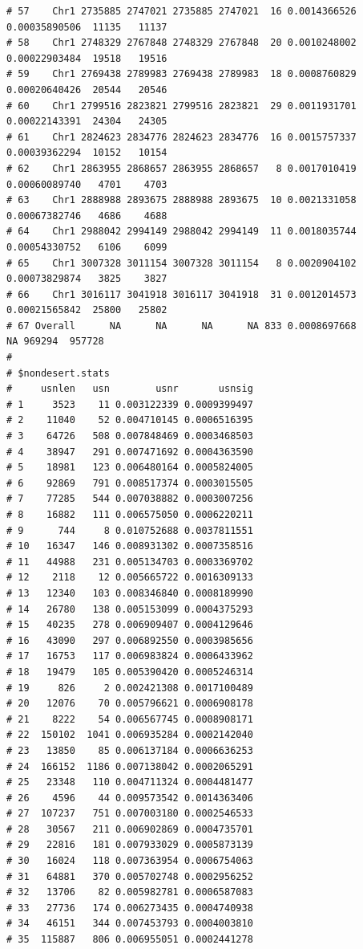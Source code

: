 \documentclass{article}\usepackage[]{graphicx}\usepackage[]{color}
\makeatletter
\newenvironment{kframe}{%
 \def\at@end@of@kframe{}%
 \ifinner\ifhmode%
  \def\at@end@of@kframe{\end{minipage}}%
  \begin{minipage}{\columnwidth}%
 \fi\fi%
 \def\FrameCommand##1{\hskip\@totalleftmargin \hskip-\fboxsep
 \colorbox{shadecolor}{##1}\hskip-\fboxsep
     \hskip-\linewidth \hskip-\@totalleftmargin \hskip\columnwidth}%
 \MakeFramed {\advance\hsize-\width
   \@totalleftmargin\z@ \linewidth\hsize
   \@setminipage}}%
 {\par\unskip\endMakeFramed%
 \at@end@of@kframe}
\newenvironment{knitrout}{}{} %
\makeatother
\begin{document}
\begin{knitrout}
\begin{kframe}
\begin{verbatim}
# 57    Chr1 2735885 2747021 2735885 2747021  16 0.0014366526 0.00035890506  11135   11137
# 58    Chr1 2748329 2767848 2748329 2767848  20 0.0010248002 0.00022903484  19518   19516
# 59    Chr1 2769438 2789983 2769438 2789983  18 0.0008760829 0.00020640426  20544   20546
# 60    Chr1 2799516 2823821 2799516 2823821  29 0.0011931701 0.00022143391  24304   24305
# 61    Chr1 2824623 2834776 2824623 2834776  16 0.0015757337 0.00039362294  10152   10154
# 62    Chr1 2863955 2868657 2863955 2868657   8 0.0017010419 0.00060089740   4701    4703
# 63    Chr1 2888988 2893675 2888988 2893675  10 0.0021331058 0.00067382746   4686    4688
# 64    Chr1 2988042 2994149 2988042 2994149  11 0.0018035744 0.00054330752   6106    6099
# 65    Chr1 3007328 3011154 3007328 3011154   8 0.0020904102 0.00073829874   3825    3827
# 66    Chr1 3016117 3041918 3016117 3041918  31 0.0012014573 0.00021565842  25800   25802
# 67 Overall      NA      NA      NA      NA 833 0.0008697668            NA 969294  957728
# 
# $nondesert.stats
#     usnlen   usn        usnr       usnsig
# 1     3523    11 0.003122339 0.0009399497
# 2    11040    52 0.004710145 0.0006516395
# 3    64726   508 0.007848469 0.0003468503
# 4    38947   291 0.007471692 0.0004363590
# 5    18981   123 0.006480164 0.0005824005
# 6    92869   791 0.008517374 0.0003015505
# 7    77285   544 0.007038882 0.0003007256
# 8    16882   111 0.006575050 0.0006220211
# 9      744     8 0.010752688 0.0037811551
# 10   16347   146 0.008931302 0.0007358516
# 11   44988   231 0.005134703 0.0003369702
# 12    2118    12 0.005665722 0.0016309133
# 13   12340   103 0.008346840 0.0008189990
# 14   26780   138 0.005153099 0.0004375293
# 15   40235   278 0.006909407 0.0004129646
# 16   43090   297 0.006892550 0.0003985656
# 17   16753   117 0.006983824 0.0006433962
# 18   19479   105 0.005390420 0.0005246314
# 19     826     2 0.002421308 0.0017100489
# 20   12076    70 0.005796621 0.0006908178
# 21    8222    54 0.006567745 0.0008908171
# 22  150102  1041 0.006935284 0.0002142040
# 23   13850    85 0.006137184 0.0006636253
# 24  166152  1186 0.007138042 0.0002065291
# 25   23348   110 0.004711324 0.0004481477
# 26    4596    44 0.009573542 0.0014363406
# 27  107237   751 0.007003180 0.0002546533
# 28   30567   211 0.006902869 0.0004735701
# 29   22816   181 0.007933029 0.0005873139
# 30   16024   118 0.007363954 0.0006754063
# 31   64881   370 0.005702748 0.0002956252
# 32   13706    82 0.005982781 0.0006587083
# 33   27736   174 0.006273435 0.0004740938
# 34   46151   344 0.007453793 0.0004003810
# 35  115887   806 0.006955051 0.0002441278

\end{verbatim}
\end{kframe}
\end{knitrout}
\end{document}
